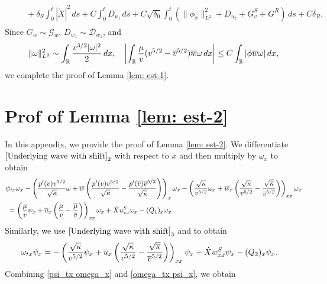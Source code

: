 \documentclass[11pt,reqno]{amsart}
\begin{document}
\begin{appendix}
\begin{align*}
\begin{aligned}
& \quad + \delta_S \int_0^t| \dot{X}|^2\,d s + C \int_0^t D_{u_1} \, d s +C \sqrt{\delta_0} \int_0^t \left( \| \phi_x \|_{L^2}^2 +D_{u_2} +G^S_v+G^R  \right) \, d s + C \delta_R. 
\end{aligned}
\end{align*}
Since $G_{w}\sim\mathcal{G}_{w}$, $D_{w_1} \sim \mathcal{D}_{w_1}$, and
\begin{align*}
\|\omega\|_{L^2}^2 \sim  \int_\mathbb{R} \frac{v^{3/2} |\omega|^2}{2} \, dx, \quad \left|\int_\mathbb{R} \frac{\mu}{v}(v^{5/2}-\overline{v}^{5/2})\overline{w} \omega \, dx\right|\le C\int_\mathbb{R} |\phi \overline{w}  \omega| \, dx,
\end{align*} 
we complete the proof of Lemma \ref{lem: est-1}.

\section{Prof of Lemma \ref{lem: est-2}}\label{app:proof_high_order_3}
\setcounter{equation}{0}
In this appendix, we provide the proof of Lemma \ref{lem: est-2}. We differentiate $\eqref{Underlying wave with shift}_2$ with respect to $x$ and then multiply by $\omega_x$ to obtain
\begin{equation} \label{psi_tx omega_x}
\begin{aligned}
& \psi_{tx} \omega_x - \left(  \frac{p'(v) v^{5/2}}{\sqrt{\kappa}} \omega + \overline{w} \left(  \frac{p'(v) v^{5/2}}{\sqrt{\kappa}}-\frac{p'(\overline{v})\overline{v}^{5/2}}{\sqrt{\overline{\kappa}}} \right) \right)_x \omega_x-\left( \frac{\sqrt{\kappa}}{v^{5/2}}\omega_x + \overline{w}_x \left( \frac{\sqrt{\kappa}}{v^{5/2}}-\frac{\sqrt{\overline{\kappa}}}{\overline{v}^{5/2}} \right) \right)_{xx} \omega_x \\
&\; =\left( \frac{\mu}{v} \psi_x+\overline{u}_x \left( \frac{\mu}{v}-\frac{\overline{\mu}}{\overline{v}} \right) \right)_{xx} \omega_x + \dot{X} u^S_{xx} \omega_x -(Q_1)_x\omega_x.
\end{aligned}
\end{equation}
Similarly, we use $\eqref{Underlying wave with shift}_3$  and to obtain
\begin{equation} \label{omega_tx psi_x}
\begin{aligned}
& \omega_{tx} \psi_x = -\left( \frac{\sqrt{\kappa}}{v^{5/2}} \psi_x+\overline{u}_x \left( \frac{\sqrt{\kappa}}{v^{5/2}}-\frac{\sqrt{\overline{\kappa}}}{\overline{v}^{5/2}} \right) \right)_{xx} \psi_x + \dot{X} w^S_{xx} \psi_x -(Q_2)_x \psi_x.
\end{aligned}
\end{equation}
Combining \eqref{psi_tx omega_x} and \eqref{omega_tx psi_x}, we obtain
\begin{align*}

\end{align*}
\end{appendix}
\end{document}
